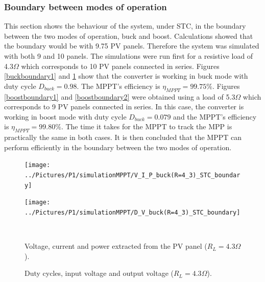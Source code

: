 \subsubsection*{Boundary between modes of operation}


This section shows the behaviour of the system, under STC, in the boundary between the two modes of operation, buck and boost. Calculations showed that the boundary would be with 9.75 PV panels. Therefore the system was simulated with both 9 and 10 panels.
The simulations were run first for a resistive load of 4.3$\Omega$ which corresponds to 10 PV panels connected in series. Figures \ref{buckboundary1} and \ref{buckboundary2} show that the converter is working in buck mode with duty cycle $D_{buck}=0.98$. The MPPT's efficiency is $\eta_{MPPT} = 99.75\% $. Figures \ref{boostboundary1} and \ref{boostboundary2} were obtained using a load of 5.3$\Omega$ which corresponds to 9 PV panels connected in series. In this case, the converter is working in boost mode with duty cycle $D_{buck}=0.079$ and the MPPT's efficiency is $\eta_{MPPT} = 99.80\% $. The time it takes for the MPPT to track the MPP is practically the same in both cases. It is then concluded that the MPPT can perform efficiently in the boundary between the two modes of operation.

\begin{figure}[H]

	\begin{minipage}[c]{0.5\textwidth}
		\centering
		\texttt{[image: ../Pictures/P1/simulationMPPT/V\_I\_P\_buck(R=4\_3)\_STC\_boundary]} %
	\end{minipage}%
	\hfill
	\begin{minipage}[c]{0.5\textwidth}
		\centering
		\texttt{[image: ../Pictures/P1/simulationMPPT/D\_V\_buck(R=4\_3)\_STC\_boundary]} %
	\end{minipage} \\ %
	\begin{minipage}[t]{0.45\textwidth}
		\caption{Voltage, current and power extracted from the PV panel ($R_{L}=4.3\Omega$).} %
		\label{buckboundary1}
	\end{minipage}%
	\hfill
	\begin{minipage}[t]{0.45\textwidth}
		\caption{Duty cycles, input voltage and output voltage ($R_{L}=4.3\Omega$).} %
		\label{buckboundary2}
	\end{minipage}
\end{figure}


